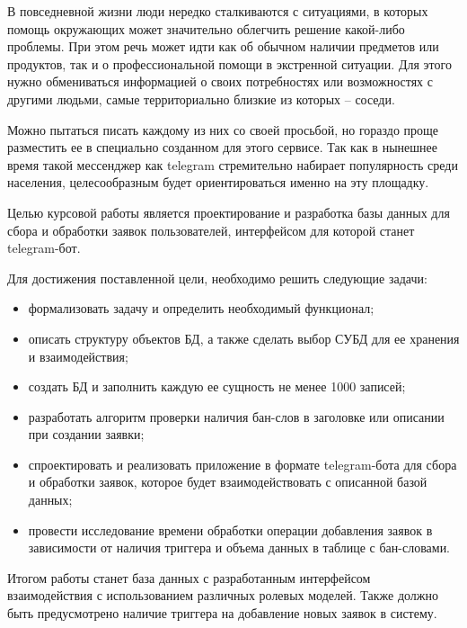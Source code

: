 
В повседневной жизни люди нередко сталкиваются с ситуациями, в которых помощь окружающих может значительно облегчить решение какой-либо проблемы. При этом речь может идти как об обычном наличии предметов или продуктов, так и о профессиональной помощи в экстренной ситуации. Для этого нужно обмениваться информацией о своих потребностях или возможностях с другими людьми, самые территориально близкие из которых -- соседи. 

Можно пытаться писать каждому из них со своей просьбой, но гораздо проще разместить ее в специально созданном для этого сервисе. Так как в нынешнее время такой мессенджер как telegram \cite{telegram} стремительно набирает популярность среди населения, целесообразным будет ориентироваться именно на эту площадку.

Целью курсовой работы является проектирование и разработка базы данных для сбора и обработки заявок пользователей, интерфейсом для которой станет telegram-бот.

Для достижения поставленной цели, необходимо решить следующие задачи:
\begin{itemize}
	\item формализовать задачу и определить необходимый функционал;
	\item описать структуру объектов БД, а также сделать выбор СУБД для ее хранения и взаимодействия;
	\item создать БД и заполнить каждую ее сущность не менее 1000 записей;
	\item разработать алгоритм проверки наличия бан-слов в заголовке или описании при создании заявки;
	\item спроектировать и реализовать приложение в формате telegram-бота для сбора и обработки заявок, которое будет взаимодействовать с описанной базой данных;
	\item провести исследование времени обработки операции добавления заявок в зависимости от наличия триггера и объема данных в таблице с бан-словами.
\end{itemize}

Итогом работы станет база данных с разработанным интерфейсом взаимодействия с использованием различных ролевых моделей. Также должно быть предусмотрено наличие триггера на добавление новых заявок в систему.